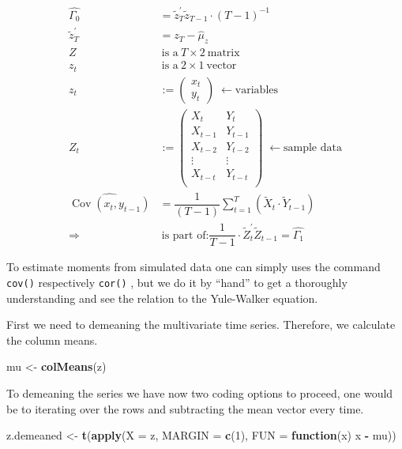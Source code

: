 \documentclass[12pt,a4paper]{article}
\newcommand{\Cov}{\operatorname{Cov}}
\newenvironment{Shaded}{\begin{snugshade}}{\end{snugshade}}
\newcommand{\ControlFlowTok}[1]{\textcolor[rgb]{0.13,0.29,0.53}{\textbf{#1}}}
\newcommand{\DataTypeTok}[1]{\textcolor[rgb]{0.13,0.29,0.53}{#1}}
\newcommand{\DecValTok}[1]{\textcolor[rgb]{0.00,0.00,0.81}{#1}}
\newcommand{\KeywordTok}[1]{\textcolor[rgb]{0.13,0.29,0.53}{\textbf{#1}}}
\newcommand{\NormalTok}[1]{#1}
\newcommand{\OperatorTok}[1]{\textcolor[rgb]{0.81,0.36,0.00}{\textbf{#1}}}
\newcommand{\StringTok}[1]{\textcolor[rgb]{0.31,0.60,0.02}{#1}}
\begin{document}
\begin{align*}
  \widehat{\Gamma_0} & = \tilde{z}_T^{'} \tilde{z}_{T-1} \cdot (T - 1)^{-1} \\
  \tilde{z}_T^{'} & = z_T - \widehat{\mu}_z\\
  Z & \ \text{is a} \ T \times 2 \ \text{matrix}\\
  z_t &\  \text{is a} \ 2 \times 1 \ \text{vector}\\
  z_t & := 
  \begin{pmatrix}
    x_t \\
    y_t
  \end{pmatrix} \; \leftarrow \text{variables}\\
  Z_t & := 
  \begin{pmatrix}
    X_{t} & Y_{t} \\
    X_{t-1} & Y_{t-1} \\
    X_{t-2} & Y_{t-2} \\
    \vdots & \vdots \\
    X_{t-t} & Y_{t-t} \\
  \end{pmatrix} \; \leftarrow \text{sample data}\\
  \widehat{\Cov(x_t, y_{t-1})} & = \dfrac{1}{(T - 1)} \sum_{t = 1}^{T}  \left( \tilde{X}_t \cdot \tilde{Y}_{t- 1} \right)\\
  \Rightarrow & \ \text{is part of:} \dfrac{1}{T -1} \cdot \tilde{Z}_t^{'} \tilde{Z}_{t-1} = \widehat{\Gamma_1}
\end{align*}

To estimate moments from simulated data one can simply uses the command
\texttt{cov()} respectively \texttt{cor()} , but we do it by
\enquote{hand} to get a thoroughly understanding and see the relation to
the Yule-Walker equation.

First we need to demeaning the multivariate time series. Therefore, we
calculate the column means.

\begin{Shaded}
\begin{Highlighting}[]
\NormalTok{mu <-}\StringTok{ }\KeywordTok{colMeans}\NormalTok{(z)}
\end{Highlighting}
\end{Shaded}

To demeaning the series we have now two coding options to proceed, one
would be to iterating over the rows and subtracting the mean vector
every time.

\begin{Shaded}
\begin{Highlighting}[]
\NormalTok{z.demeaned <-}\StringTok{ }\KeywordTok{t}\NormalTok{(}\KeywordTok{apply}\NormalTok{(}\DataTypeTok{X =}\NormalTok{ z, }\DataTypeTok{MARGIN =} \KeywordTok{c}\NormalTok{(}\DecValTok{1}\NormalTok{), }\DataTypeTok{FUN =} \ControlFlowTok{function}\NormalTok{(x) x }\OperatorTok{-}\StringTok{ }\NormalTok{mu))}
\end{Highlighting}
\end{Shaded}
\end{document}
